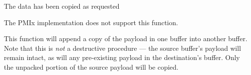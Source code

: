 \begin{constantdesc}
\item {} The data has been copied as requested
\item {} The \ac{PMIx} implementation does not support this function.
\end{constantdesc}

\descr

This function will append a copy of the payload in one buffer into another buffer. Note that this is \textit{not} a destructive procedure --- the source buffer's payload will remain intact, as will any pre-existing payload in the destination's buffer. Only the unpacked portion of the source payload will be copied.


